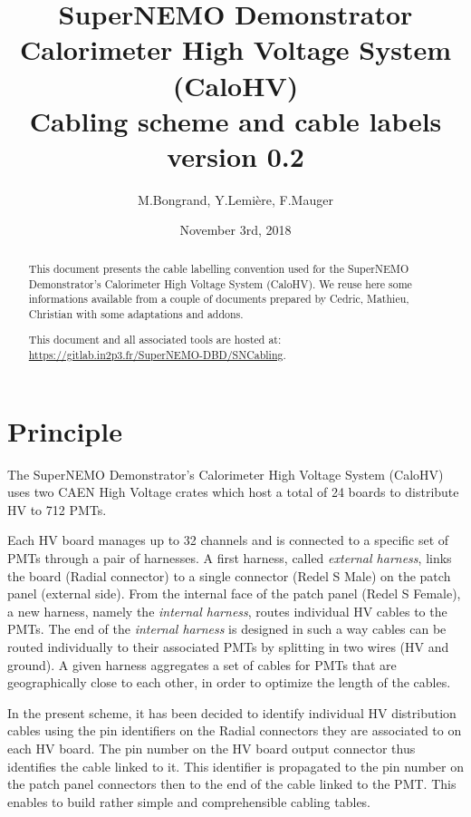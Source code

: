 \documentclass[12pt,a4paper]{article}
\title{SuperNEMO Demonstrator\\
  Calorimeter High Voltage System (CaloHV)\\
  Cabling scheme and cable labels\\
  version 0.2}
\author{M.Bongrand, Y.Lemi\`ere, F.Mauger}
\date{November 3rd, 2018}
\begin{document}
\maketitle

\begin{abstract}
  \noindent This document presents the cable labelling convention used
  for  the SuperNEMO  Demonstrator's Calorimeter  High Voltage  System
  (CaloHV).  We reuse  here some informations available  from a couple
  of documents prepared  by Cedric, Mathieu, Christian  with some adaptations
  and addons.

  \vskip 10pt
  \noindent This document and all associated tools
  are hosted at:
  \vskip 5pt
  \url{https://gitlab.in2p3.fr/SuperNEMO-DBD/SNCabling}.
  
\end{abstract}

\tableofcontents
\vfill

\clearpage
\section{Principle}

The SuperNEMO Demonstrator's Calorimeter  High Voltage System (CaloHV)
uses two CAEN High  Voltage crates which host a total  of 24 boards to
distribute HV to 712 PMTs.

Each HV board manages up to 32 channels and is connected to a specific
set of  PMTs through  a pair  of harnesses.   A first  harness, called
\emph{external  harness},  links the  board  (Radial  connector) to  a
single  connector  (Redel  S  Male)   on  the  patch  panel  (external
side). From the  internal face of the patch panel  (Redel S Female), a
new harness, namely the  \emph{internal harness}, routes individual HV
cables  to  the PMTs.   The  end  of  the \emph{internal  harness}  is
designed in  such a  way cables  can be  routed individually  to their
associated PMTs  by splitting in two  wires (HV and ground).   A given
harness aggregates  a set of  cables for PMTs that  are geographically
close to each other, in order to optimize the length of the cables.

In the present  scheme, it has been decided to  identify individual HV
distribution cables using the pin identifiers on the Radial connectors
they are  associated to on  each HV board.  The  pin number on  the HV
board output connector  thus identifies the cable linked  to it.  This
identifier  is  propagated  to  the  pin number  on  the  patch  panel
connectors  then to  the end  of the  cable linked  to the  PMT.  This
enables to build rather simple and comprehensible cabling tables.
\end{document}
